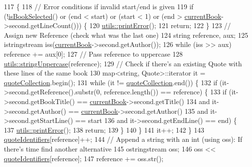 \begin{DoxyCode}
117                                             \{
118     \textcolor{comment}{// Error conditions if invalid start/end is given}
119     \textcolor{keywordflow}{if} (!\hyperlink{class_library_a04ff0757054c2813e89036cdd3f7f91f}{isBookSelected}() or (end < start) or (start < 1) or (end > 
      \hyperlink{class_library_a78a4071e8d610da671b3886c71900dae}{currentBook}->second.getLineCount())) \{
120         \hyperlink{namespaceutils_afd76dd21b41c50ce7396e30fb5d8d75b}{utils::printError}();
121         \textcolor{keywordflow}{return};
122     \}
123     \textcolor{comment}{// Assign new Reference (check what was the last one)}
124     \textcolor{keywordtype}{string} reference, aux;
125     istringstream iss(\hyperlink{class_library_a78a4071e8d610da671b3886c71900dae}{currentBook}->second.getAuthor());
126     \textcolor{keywordflow}{while} (iss >> aux) reference += aux[0];
127     \textcolor{comment}{// Pass reference to uppercase}
128     \hyperlink{namespaceutils_a4cc31521e740c9e31b4bfa8ee85eff46}{utils::stringUppercase}(reference);
129     \textcolor{comment}{// Check if there's an existing Quote with these lines of the same book}
130     map<string, Quote>::iterator it = \hyperlink{class_library_a0f9136df5fc6e8901cb8524e026cb147}{quoteCollection}.begin();
131     \textcolor{keywordflow}{while} (it != \hyperlink{class_library_a0f9136df5fc6e8901cb8524e026cb147}{quoteCollection}.end()) \{
132         \textcolor{keywordflow}{if} (it->second.getReference().substr(0, reference.length()) == reference) \{
133             \textcolor{keywordflow}{if} (it->second.getBookTitle() == \hyperlink{class_library_a78a4071e8d610da671b3886c71900dae}{currentBook}->second.getTitle()
134                 and it->second.getAuthor() == \hyperlink{class_library_a78a4071e8d610da671b3886c71900dae}{currentBook}->second.getAuthor()
135                 and it->second.getStartLine() == start
136                 and it->second.getEndLine() == end) \{
137                 \hyperlink{namespaceutils_afd76dd21b41c50ce7396e30fb5d8d75b}{utils::printError}();
138                 \textcolor{keywordflow}{return};
139             \}
140         \}
141         it++;
142     \}
143     \hyperlink{class_library_a58c1f12a0278872cd0299e586551bb7a}{quoteIdentifiers}[reference]++;
144     \textcolor{comment}{// Append a string with an int (using oss): If there's time find another alternative}
145     ostringstream oss;
146     oss << \hyperlink{class_library_a58c1f12a0278872cd0299e586551bb7a}{quoteIdentifiers}[reference];
147     reference += oss.str();

\end{DoxyCode}

